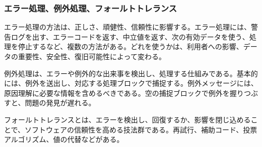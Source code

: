 \subsubsection{エラー処理、例外処理、フォールトトレランス}

エラー処理の方法は、正しさ、頑健性、信頼性に影響する。エラー処理には、警告ログを出す、エラーコードを返す、中立値を返す、次の有効データを使う、処理を停止するなど、複数の方法がある。どれを使うかは、利用者への影響、データの重要性、安全性、復旧可能性によって変わる。

例外処理は、エラーや例外的な出来事を検出し、処理する仕組みである。基本的には、例外を送出し、対応する処理ブロックで捕捉する。例外メッセージには、原因理解に必要な情報を含めるべきである。空の捕捉ブロックで例外を握りつぶすと、問題の発見が遅れる。

フォールトトレランスとは、エラーを検出し、回復するか、影響を閉じ込めることで、ソフトウェアの信頼性を高める技法群である。再試行、補助コード、投票アルゴリズム、値の代替などがある。
